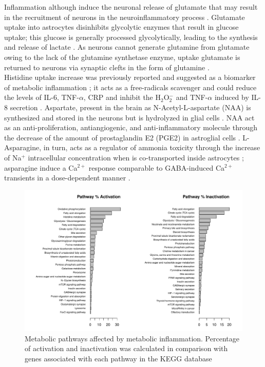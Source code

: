 Inflammation although induce the neuronal release of glutamate that may result in the recruitment of neurons in the neuroinflammatory process \cite{Parpura2000}. Glutamate uptake into astrocytes disinhibits glycolytic enzymes that result in glucose uptake;  this glucose is generally processed glycolytically, leading to the synthesis and release of lactate \cite{Jha2016}. As neurons cannot generate glutamine from glutamate owing to the lack of the glutamine synthetase enzyme, uptake glutamate is returned to neurons via synaptic clefts in the form of glutamine \cite{Hertz1999}.\\

Histidine uptake increase was previously reported and suggested as a biomarker of metabolic inflammation \cite{Niu2012}; it acts as a free-radicals scavenger and could reduce the levels of IL-6, TNF-$\alpha$, CRP and inhibit the H$_2$O$_2^-$ and TNF-$\alpha$ induced by IL-8 secretion \cite{Lee2005,Son2005}. Aspartate, present in the brain as N-Acetyl-L-aspartate (NAA) is synthesized and stored in the neurons but is hydrolyzed in glial cells \cite{Baslow2003}. NAA act as an anti-proliferation, antiangiogenic, and anti-inflammatory molecule through the decrease of the amount of prostaglandin E2 (PGE2) in astroglial cells \cite{Rael2004}. L-Asparagine, in turn, acts as a regulator of ammonia toxicity through the increase of Na$^+$ intracellular concentration when is co-transported inside astrocytes \cite{Chaudhry1999}; asparagine induce a Ca$^{2+}$ response comparable to GABA-induced Ca$^{2+}$ transients in a dose-dependent manner \cite{Doengi2009}. \\

\begin{figure}[h]
\begin{center}
\includegraphics[width=\textwidth]{neuroprotective/Healthy2Inflammated}
\end{center}
\caption{Metabolic pathways affected by metabolic inflammation. Percentage of activation and inactivation was calculated in comparison with genes associated with each pathway in the KEGG database}
\label{h2i}
\end{figure}

